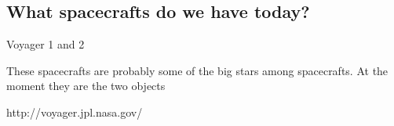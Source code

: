 \subsection*{What spacecrafts do we have today?}
Voyager 1 and 2

These spacecrafts are probably some of the big stars among spacecrafts.
At the moment they are the two objects 



http://voyager.jpl.nasa.gov/


